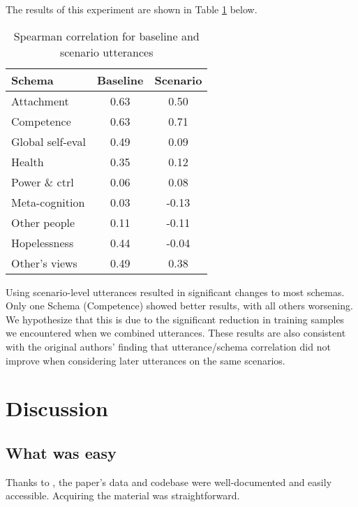 \documentclass[11pt,a4paper]{article}
\begin{document}
The results of this experiment are shown in Table \ref{tab:scenario_preprocessing} below.

\begin{table}[H]
\centering
\begin{tabular}{lcc}
\toprule
Schema                  &Baseline          &Scenario \\ %
\midrule
Attachment              & 0.63 & 0.50 \\
Competence              & 0.63 & 0.71 \\
Global self-eval        & 0.49 & 0.09 \\
Health                  & 0.35 & 0.12 \\
Power \& ctrl           & 0.06 & 0.08 \\
Meta-cognition          & 0.03 & -0.13 \\
Other people            & 0.11 & -0.11 \\
Hopelessness            & 0.44 & -0.04 \\
Other's views           & 0.49 & 0.38 \\
\bottomrule
\end{tabular}
\caption{Spearman correlation for baseline and scenario utterances}
\label{tab:scenario_preprocessing}
\end{table}

Using scenario-level utterances resulted in significant changes to most schemas. Only one Schema (Competence) showed better results, with all others worsening. We hypothesize that this is due to the significant reduction in training samples we encountered when we combined utterances. These results are also consistent with the original authors' finding that utterance/schema correlation did not improve when considering later utterances on the same scenarios.

\section{Discussion}
\subsection{What was easy}
Thanks to \citeauthor{burger_2021}, the paper's data and codebase were well-documented and easily accessible. Acquiring the material was straightforward. 
\end{document}
